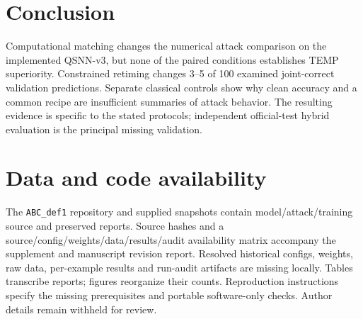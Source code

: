 \section{Conclusion}\label{sec:conclusion}
Computational matching changes the numerical attack comparison on the implemented QSNN-v3, but none of the paired conditions establishes TEMP superiority. Constrained retiming changes 3--5 of 100 examined joint-correct validation predictions. Separate classical controls show why clean accuracy and a common recipe are insufficient summaries of attack behavior. The resulting evidence is specific to the stated protocols; independent official-test hybrid evaluation is the principal missing validation.

\section*{Data and code availability}
The \texttt{ABC\_def1} repository \cite{repository} and supplied snapshots contain model/attack/training source and preserved reports. Source hashes and a source/config/weights/data/results/audit availability matrix accompany the supplement and manuscript revision report. Resolved historical configs, weights, raw data, per-example results and run-audit artifacts are missing locally. Tables transcribe reports; figures reorganize their counts. Reproduction instructions specify the missing prerequisites and portable software-only checks. Author details remain withheld for review.
